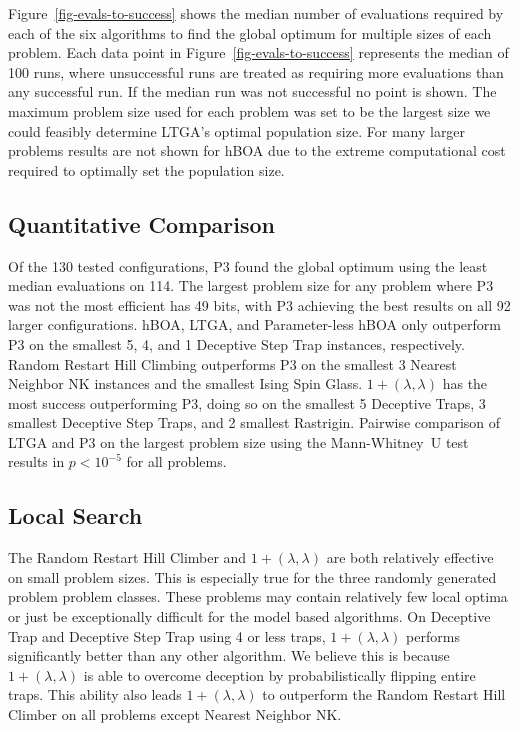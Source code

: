 \documentclass[twoside]{article}
\begin{document}
Figure~\ref{fig-evals-to-success} shows the median number of evaluations required by each of the six
algorithms to find the global optimum for multiple sizes of each problem.  Each data point in
Figure~\ref{fig-evals-to-success} represents the median of 100 runs, where unsuccessful runs
are treated as requiring more evaluations than any successful run. If the median run was not successful
no point is shown. The maximum problem size used for each problem was set to be the largest size we could
feasibly determine LTGA's optimal population size. For many larger problems results are not shown
for hBOA due to the extreme computational cost required to optimally set the population size.

\subsection{Quantitative Comparison}
Of the 130 tested configurations, P3 found the global optimum using the least median evaluations on 114.
The largest problem size for any problem where P3 was not the most efficient has 49 bits, with P3 achieving the best results on all 92 larger
configurations. hBOA, LTGA, and Parameter-less hBOA only outperform P3 on the smallest 5, 4, and 1 Deceptive
Step Trap instances, respectively. Random Restart Hill Climbing outperforms P3 on the smallest 3 Nearest Neighbor NK instances
and the smallest Ising Spin Glass. $1+(\lambda, \lambda)$ has the most success outperforming P3, doing so
on the smallest 5 Deceptive Traps, 3 smallest Deceptive Step Traps, and 2 smallest Rastrigin.
Pairwise comparison of LTGA and P3 on the largest problem size using the Mann-Whitney~U test results in
$p < 10^{-5}$ for all problems.

\subsection{Local Search}
The Random Restart Hill Climber and $1+(\lambda, \lambda)$ are both relatively effective on small problem
sizes. This is especially true for the three randomly generated problem problem classes. These problems
may contain relatively few local optima or just be exceptionally difficult for the model based algorithms.
On Deceptive Trap and Deceptive Step Trap using 4 or less traps, $1+(\lambda, \lambda)$ performs significantly
better than any other algorithm. We believe this is
because $1+(\lambda, \lambda)$ is able to overcome deception by probabilistically
flipping entire traps.
This ability also leads $1+(\lambda, \lambda)$
to outperform the Random Restart Hill Climber on all problems except Nearest Neighbor NK.
\end{document}
